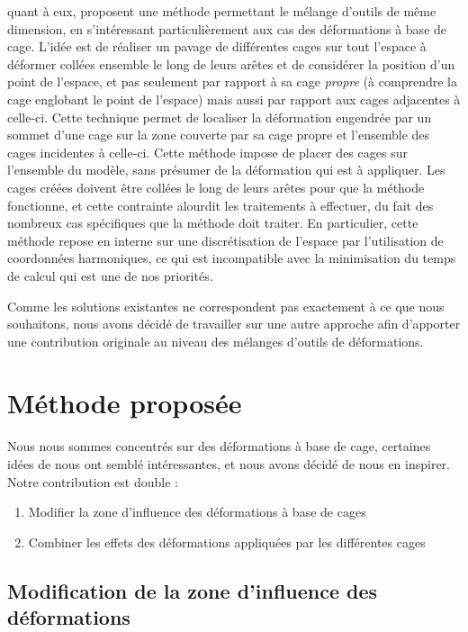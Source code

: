 \cite{GPCP13} quant à eux, proposent une méthode permettant le mélange
d'outils de même dimension, en s'intéressant particulièrement aux cas des
déformations à base de cage. L'idée est de réaliser un pavage de différentes
cages sur tout l'espace à déformer  collées ensemble le long de leurs arêtes
et de considérer la position d'un point de l'espace, et pas seulement par
rapport à sa cage \textit{propre} (à comprendre la cage englobant le point de
l'espace) mais aussi par rapport aux cages adjacentes à celle-ci. Cette
technique permet de localiser la déformation engendrée par un sommet d'une
cage sur la zone couverte par sa cage propre et l'ensemble des cages
incidentes à celle-ci. Cette méthode impose de placer des cages sur l'ensemble
du modèle, sans présumer de la déformation qui est à appliquer. Les cages
créées doivent être collées le long de leurs arêtes pour que la méthode
fonctionne, et cette contrainte alourdit les traitements à effectuer, du fait
des nombreux cas spécifiques que la méthode doit traiter. En particulier,
cette méthode repose en interne sur une discrétisation de l'espace par
l'utilisation de coordonnées harmoniques, ce qui est incompatible avec la
minimisation du temps de calcul qui est une de nos priorités.

Comme les solutions existantes ne correspondent pas exactement à ce que nous
souhaitons, nous avons décidé de travailler sur une autre approche afin
d'apporter une contribution originale au niveau des mélanges d'outils de
déformations.

\section{Méthode proposée}

Nous nous sommes concentrés sur des déformations à base de cage, certaines
idées de \cite{GPCP13} nous ont semblé intéressantes, et nous avons décidé de
nous en inspirer. Notre contribution est double :

\begin{enumerate}

\item Modifier la zone d'influence des déformations à base de cages

\item Combiner les effets des déformations appliquées par les différentes
cages

\end{enumerate}

\subsection{Modification de la zone d'influence des déformations}

